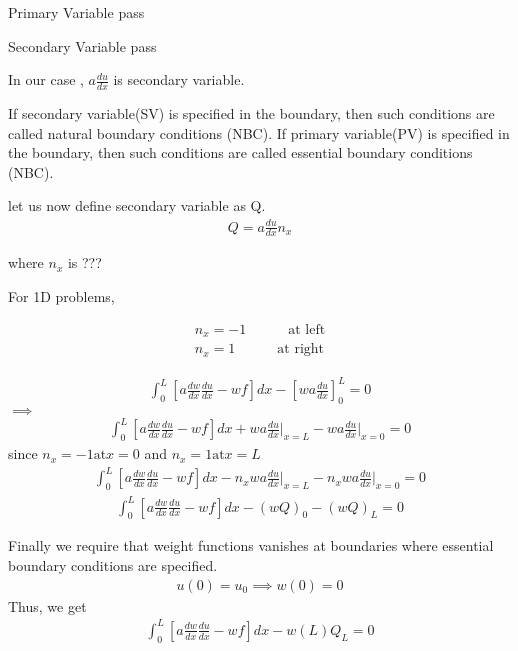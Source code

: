 \begin{itemize}
\begin{df}{Primary Variable}
	pass
\end{df}
\begin{df}{Secondary Variable}
	pass
\end{df}

In our case , $ a \frac{du}{dx}$ is secondary variable.

If secondary variable(SV) is specified in the boundary, then such conditions are called natural boundary conditions (NBC).
If primary variable(PV) is specified in the boundary, then such conditions are called essential boundary conditions (NBC).

let us now define secondary variable as Q.
\begin{eqnarray}
	Q = a\frac{du}{dx} n_x
\end{eqnarray}

where $n_x$ is ???

For 1D problems,

\begin{eqnarray}
	n_x = -1 \quad\quad\quad \text{at left}\\
	n_x = 1 \quad\quad\quad \text{at right}
\end{eqnarray}


	\begin{eqnarray}
	\int_{0}^{L} \left[ a \frac{dw}{dx} \frac{du}{dx} - wf \right] dx  - \left[ wa \frac{du}{dx}\right]_0^L = 0
    \end{eqnarray}
	$\implies$
	\begin{eqnarray}
		\int_{0}^{L} \left[ a \frac{dw}{dx} \frac{du}{dx} - wf \right] dx  + wa\frac{du}{dx}\biggr|_{x=L} - wa\frac{du}{dx}\biggr|_{x=0} = 0
	\end{eqnarray}
	since $n_x = -1 \text{at} x = 0 $ and $n_x = 1 \text{at} x = L$
	\begin{eqnarray}
		\int_{0}^{L} \left[ a \frac{dw}{dx} \frac{du}{dx} - wf \right] dx  - n_xwa\frac{du}{dx}\biggr|_{x=L} - n_xwa\frac{du}{dx}\biggr|_{x=0} = 0
	\end{eqnarray}
	\begin{eqnarray}
	\int_{0}^{L} \left[ a \frac{dw}{dx} \frac{du}{dx} - wf \right] dx  -(wQ)_0  -(wQ)_L = 0
	\end{eqnarray}
	
	Finally we require that weight functions vanishes at boundaries where essential boundary conditions are specified.
	\begin{eqnarray}
		u(0) = u_0 \implies w(0) = 0
	\end{eqnarray}
Thus, we get
	\begin{eqnarray}
		\int_{0}^{L} \left[ a \frac{dw}{dx} \frac{du}{dx} - wf \right] dx   -w(L)Q_L = 0
	\end{eqnarray}

	
\end{itemize}

